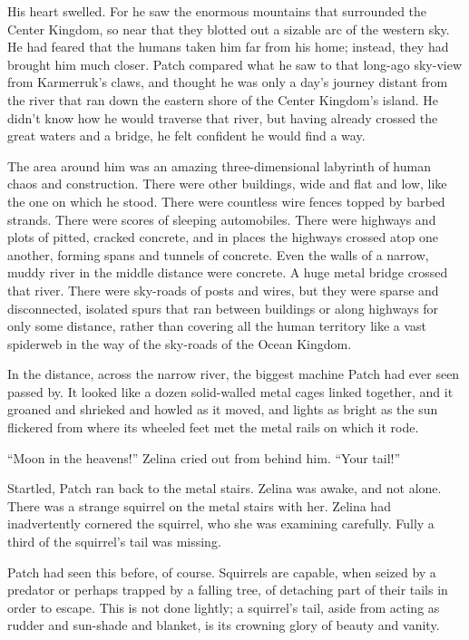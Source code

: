 \documentclass[ebook,oneside,openany,17pt]{memoir}
\newenvironment{tolerant}[1]{%
  \par\tolerance=#1\relax
}{%
  \par
}
\begin{document}
His heart swelled. For he saw the enormous mountains that surrounded
the Center Kingdom, so near that they blotted out a sizable arc of the
western sky. He had feared that the humans taken him far from his
home; instead, they had brought him much closer. Patch compared what
he saw to that long-ago sky-view from Karmerruk’s claws, and thought
he was only a day’s journey distant from the river that ran down the
eastern shore of the Center Kingdom’s island. He didn’t know how he
would traverse that river, but having already crossed the great waters
and a bridge, he felt confident he would find a way.

\begin{tolerant}{2000}
The area around him was an amazing three-dimen\-sion\-al labyrinth of
human chaos and construction. There were other buildings, wide and
flat and low, like the one on which he stood. There were countless
wire fences topped by barbed strands. There were scores of sleeping
automobiles. There were highways and plots of pitted, cracked
concrete, and in places the highways crossed atop one another, forming
spans and tunnels of concrete. Even the walls of a narrow, muddy river
in the middle distance were concrete. A huge metal bridge crossed that
river. There were sky-roads of posts and wires, but they were sparse
and disconnected, isolated spurs that ran between buildings or along
highways for only some distance, rather than covering all the human
territory like a vast spiderweb in the way of the sky-roads of the
Ocean Kingdom.
\end{tolerant}

\begin{tolerant}{2000}
In the distance, across the narrow river, the big\-gest machine Patch
had ever seen passed by. It looked like a dozen solid-walled metal
cages linked together, and it groaned and shrieked and howled as it
moved, and lights as bright as the sun flickered from where its
wheeled feet met the metal rails on which it rode.
\end{tolerant}

“Moon in the heavens!” Zelina cried out from behind him. “Your tail!”

Startled, Patch ran back to the metal stairs. Zelina was awake, and
not alone. There was a strange squirrel on the metal stairs with
her. Zelina had inadvertently cornered the squirrel, who she was
examining carefully. Fully a third of the squirrel’s tail was missing.

Patch had seen this before, of course. Squirrels are capable, when
seized by a predator or perhaps trapped by a falling tree, of
detaching part of their tails in order to escape. This is not done
lightly; a squirrel’s tail, aside from acting as rudder and sun-shade
and blanket, is its crowning glory of beauty and vanity.
\end{document}
